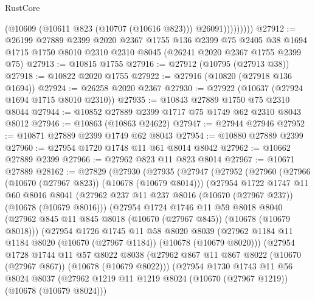 \begin{lexlean}{RustCore}
\begin{coremodule}
                    (@10609 (@10611 @823 (@10707 (@10616 @823))) @26091)))))))))
@27912 := @26199
    @27889
    @2399
    @2020
    @2367
    @1755
    @136
    @2399
    @75
    @2405
    @38
    @1694
    @1715
    @1750
    @8010
    @2310
    @2310
    @8045
    (@26241 @2020 @2367 @1755 @2399 @75)
@27913 := @10815 @1755
@27916 := @27912 (@10795 (@27913 @38))
@27918 := @10822 @2020 @1755
@27922 := @27916 (@10820 (@27918 @136 @1694))
@27924 := @26258 @2020 @2367
@27930 := @27922 (@10637 (@27924 @1694 @1715 @8010 @2310))
@27935 := @10843 @27889 @1750 @75 @2310 @8044
@27944 := @10852 @27889 @2399 @1717 @75 @1749 @62 @2310 @8043 @8012
@27946 := @10863 (@10863 @24622)
@27947 := @27944 @27946
@27952 := @10871 @27889 @2399 @1749 @62 @8043
@27954 := @10880 @27889 @2399
@27960 := @27954 @1720 @1748 @11 @61 @8014 @8042
@27962 := @10662 @27889 @2399
@27966 := @27962 @823 @11 @823 @8014
@27967 := @10671 @27889
@28162 := @27829
    (@27930
      (@27935
        (@27947
          (@27952
            (@27960
              (@27966 (@10670 (@27967 @823)) (@10678 (@10679 @8014)))
              (@27954
                @1722
                @1747
                @11
                @60
                @8016
                @8041
                (@27962 @237 @11 @237 @8016 (@10670 (@27967 @237)) (@10678 (@10679 @8016)))
                (@27954
                  @1724
                  @1746
                  @11
                  @59
                  @8018
                  @8040
                  (@27962 @845 @11 @845 @8018 (@10670 (@27967 @845)) (@10678 (@10679 @8018)))
                  (@27954
                    @1726
                    @1745
                    @11
                    @58
                    @8020
                    @8039
                    (@27962 @1184 @11 @1184 @8020 (@10670 (@27967 @1184)) (@10678 (@10679 @8020)))
                    (@27954
                      @1728
                      @1744
                      @11
                      @57
                      @8022
                      @8038
                      (@27962 @867 @11 @867 @8022 (@10670 (@27967 @867)) (@10678 (@10679 @8022)))
                      (@27954
                        @1730
                        @1743
                        @11
                        @56
                        @8024
                        @8037
                        (@27962
                          @1219
                          @11
                          @1219
                          @8024
                          (@10670 (@27967 @1219))
                          (@10678 (@10679 @8024)))

\end{coremodule}
\end{lexlean}
